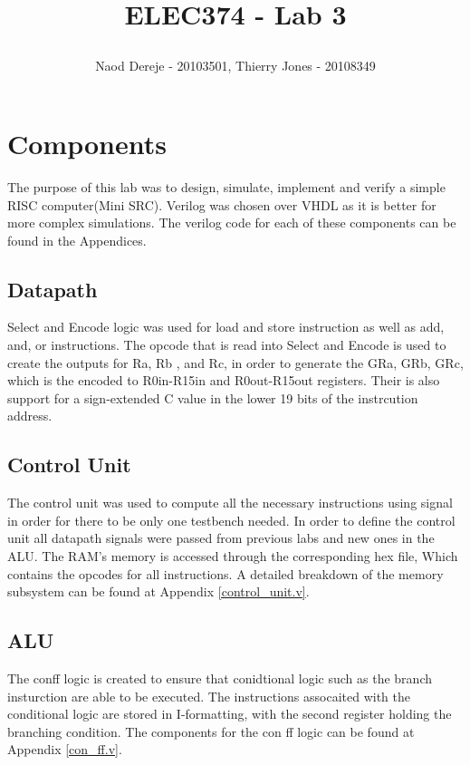 \documentclass{article}
\title{
    \begin{large}
        ELEC374 - Lab 3
    \end{large}
}
\author{Naod Dereje - 20103501, Thierry Jones - 20108349}
\begin{document}
\maketitle
\cleardoublepage
\tableofcontents
\cleardoublepage

\section{Components}
    The purpose of this lab was to design, simulate, implement and verify a simple RISC computer(Mini SRC). 
    Verilog was chosen over VHDL as it is better for more complex simulations. The verilog code for each of these components can be found in the Appendices.
    
    \subsection{Datapath}
    Select and Encode logic was used for load and store instruction as well as add, and, or instructions. The opcode that is read into Select and Encode is used to create the outputs for Ra, Rb , and Rc, in order to generate the GRa, GRb, GRc, which is the encoded to R0in-R15in and R0out-R15out registers. Their is also support for a sign-extended C value in the lower 19 bits of the instrcution address.

    \subsection{Control Unit}
    The control unit was used to compute all the necessary instructions using signal in order for there to be only one testbench needed.
    In order to define the control unit all datapath signals were passed from previous labs and new ones in the ALU. The RAM's memory is 
    accessed through the corresponding hex file, Which contains the opcodes for all instructions.
    A detailed breakdown of the memory subsystem can be found at Appendix \ref{control_unit.v}.

    \subsection{ALU}
    The conff logic is created to ensure that conidtional logic such as the branch insturction are able to be executed. The instructions assocaited with the conditional logic 
    are stored in I-formatting, with the second register holding the branching condition. The components for the con ff logic can be found at Appendix \ref{con_ff.v}.
\end{document}
